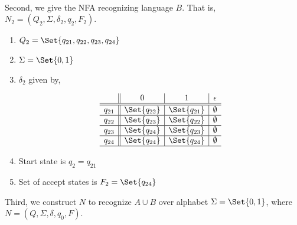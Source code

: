 \documentclass{article}
\begin{document}
\paragraph{}

Second, we give the NFA recognizing language $B$.  That is, $N_2 = (Q_2, \Sigma, \delta_2, q_2, F_2)$.

\begin{enumerate}
    \item $Q_2 = \Set{q_{21},q_{22},q_{23},q_{24}}$
    \item $\Sigma = \Set{0,1}$
    \item $\delta_2$ given by, 
    
\begin{figure}[H]
\centering

\[
\begin{array}{c||c|c|c}
         & 0 & 1 & \epsilon \\ \hline \hline 
        q_{21} & \Set{q_{22}} & \Set{q_{21}} & \emptyset \\ \hline 
        q_{22} & \Set{q_{23}} & \Set{q_{22}} & \emptyset \\ \hline 
        q_{23} & \Set{q_{24}} & \Set{q_{23}} & \emptyset \\ \hline 
        q_{24} & \Set{q_{24}} & \Set{q_{24}} & \emptyset \\ \hline 
\end{array}
\]

\caption{}
\label{fig:mylabel}
\end{figure}

    
    \item Start state is $q_2 = q_{21}$
    \item Set of accept states is $F_2 = \Set{q_{24}}$
\end{enumerate}

Third, we construct $N$ to recognize $A \cup B$ over alphabet $\Sigma = \Set{0,1}$, where $N = (Q, \Sigma, \delta, q_0, F)$.
\end{document}
